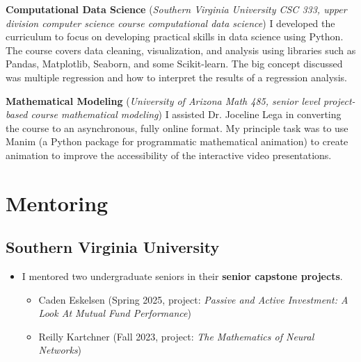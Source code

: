 \documentclass{article}
\begin{document}
\bigskip

\textbf{Computational Data Science} (\emph{Southern Virginia University CSC 333, upper division computer science course computational data science}) I developed the curriculum to focus on developing practical skills in data science using Python. The course covers data cleaning, visualization, and analysis using libraries such as Pandas, Matplotlib, Seaborn, and some Scikit-learn. The big concept discussed was multiple regression and how to interpret the results of a regression analysis.

\bigskip

\textbf{Mathematical Modeling} (\emph{University of Arizona Math 485, senior level project-based course mathematical modeling})
I assisted Dr. Joceline Lega in converting the course to an asynchronous, fully online format. My principle task was to use Manim (a Python package for programmatic mathematical animation) to create animation to improve the accessibility of the interactive video presentations.

\section*{Mentoring}
\subsection*{Southern Virginia University}
\begin{itemize}
    \item I mentored two undergraduate seniors in their {\bf senior capstone projects}.
    \begin{itemize}
        \item Caden Eskelsen (Spring 2025, project: \emph{Passive and Active Investment:
        A Look At Mutual Fund Performance})
        \item Reilly Kartchner (Fall 2023, project: \emph{The Mathematics of Neural Networks})
    \end{itemize}
  \end{itemize}
\end{document}
